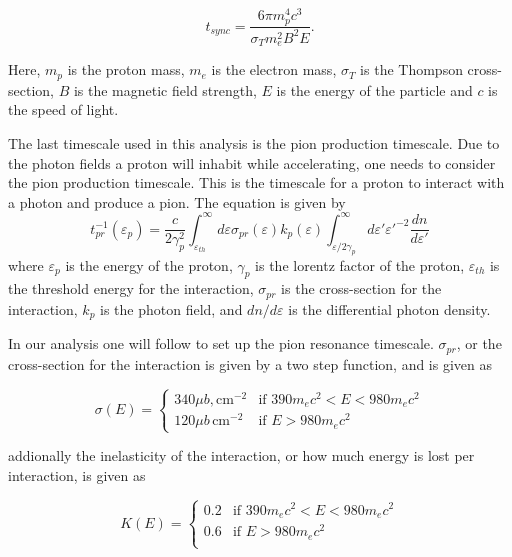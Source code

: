 \begin{equation}
    t_{sync} = \frac{6\pi m_p^4 c^3}{\sigma_T m_e^2 B^2 E}.
\end{equation}

Here, $m_p$ is the proton mass, $m_e$ is the electron mass, $\sigma_T$ is the Thompson cross-section, $B$ is the magnetic field strength, $E$ is the energy of the particle and $c$ is the speed of light. 


The last timescale used in this analysis is the pion production timescale. Due to the photon fields a proton will inhabit while accelerating, one needs to consider the pion production timescale. This is the timescale for a proton to interact with a photon and produce a pion. The equation is given by
\begin{equation}
    t_{pr}^{-1}(\varepsilon_p) = \frac{c}{2\gamma_p^2} \int_{\varepsilon_{th}}^{\infty} d\varepsilon \sigma_{pr}(\varepsilon) k_p(\varepsilon) \int_{\varepsilon/2\gamma_p}^{\infty} d\varepsilon' \varepsilon'^{-2} \frac{dn}{d\varepsilon'}
\end{equation}
where $\varepsilon_p$ is the energy of the proton, $\gamma_p$ is the lorentz factor of the proton, $\varepsilon_{th}$ is the threshold energy for the interaction, $\sigma_{pr}$ is the cross-section for the interaction, $k_p$ is the photon field, and $dn/d\varepsilon$ is the differential photon density.

In our analysis one will follow \cite{BHradiation} to set up the pion resonance timescale. $\sigma_{pr}$, or the cross-section for the interaction is given by a two step function, and is given as 

\begin{equation}
    \sigma(E) = 
    \begin{cases} 
    340 \mu b, \text{cm}^{-2} & \text{if } 390 m_e c^2 < E < 980 m_e c^2 \\
    120 \mu b \, \text{cm}^{-2} & \text{if } E > 980 m_e c^2 
    \end{cases}
\end{equation}

addionally the inelasticity of the interaction, or how much energy is lost per interaction, is given as

\begin{equation}
    K(E) = 
    \begin{cases} 
    0.2 & \text{if } 390 m_e c^2 < E < 980 m_e c^2 \\
    0.6 & \text{if } E > 980 m_e c^2 \\

\end{cases}
\end{equation}


